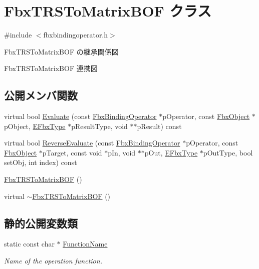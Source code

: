 \hypertarget{class_fbx_t_r_s_to_matrix_b_o_f}{}\section{Fbx\+T\+R\+S\+To\+Matrix\+B\+OF クラス}
\label{class_fbx_t_r_s_to_matrix_b_o_f}


{\ttfamily \#include $<$fbxbindingoperator.\+h$>$}



Fbx\+T\+R\+S\+To\+Matrix\+B\+OF の継承関係図


Fbx\+T\+R\+S\+To\+Matrix\+B\+OF 連携図
\subsection*{公開メンバ関数}
\begin{DoxyCompactItemize}
\item 
virtual bool \hyperlink{class_fbx_t_r_s_to_matrix_b_o_f_a41e6ce21b68dc69b6a71cded68676d1c}{Evaluate} (const \hyperlink{class_fbx_binding_operator}{Fbx\+Binding\+Operator} $\ast$p\+Operator, const \hyperlink{class_fbx_object}{Fbx\+Object} $\ast$p\+Object, \hyperlink{fbxpropertytypes_8h_a73913a5ddfb20e57c6f25e9e6784bd92}{E\+Fbx\+Type} $\ast$p\+Result\+Type, void $\ast$$\ast$p\+Result) const
\item 
virtual bool \hyperlink{class_fbx_t_r_s_to_matrix_b_o_f_a0152c2805f41834ea2554d4d865e308c}{Reverse\+Evaluate} (const \hyperlink{class_fbx_binding_operator}{Fbx\+Binding\+Operator} $\ast$p\+Operator, const \hyperlink{class_fbx_object}{Fbx\+Object} $\ast$p\+Target, const void $\ast$p\+In, void $\ast$$\ast$p\+Out, \hyperlink{fbxpropertytypes_8h_a73913a5ddfb20e57c6f25e9e6784bd92}{E\+Fbx\+Type} $\ast$p\+Out\+Type, bool set\+Obj, int index) const
\item 
\hyperlink{class_fbx_t_r_s_to_matrix_b_o_f_adc9b58f91d49a69d198660387a6cef3b}{Fbx\+T\+R\+S\+To\+Matrix\+B\+OF} ()
\item 
virtual \hyperlink{class_fbx_t_r_s_to_matrix_b_o_f_aff0fa88c1eece14c90373ea53674f4ae}{$\sim$\+Fbx\+T\+R\+S\+To\+Matrix\+B\+OF} ()
\end{DoxyCompactItemize}
\subsection*{静的公開変数類}
\begin{DoxyCompactItemize}
\item 
static const char $\ast$ \hyperlink{class_fbx_t_r_s_to_matrix_b_o_f_a91c277c5be0b7fef6081446541badd1a}{Function\+Name}
\begin{DoxyCompactList}\small\item\em Name of the operation function. \end{DoxyCompactList}\end{DoxyCompactItemize}


